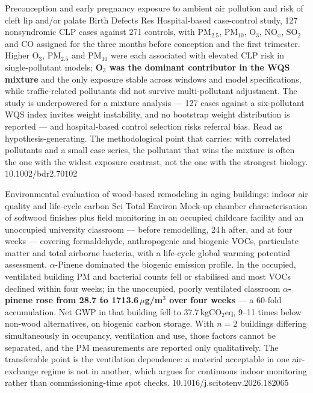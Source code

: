 \documentclass[10pt]{article}
\begin{document}

{Preconception and early pregnancy exposure to ambient air pollution and risk of cleft
lip and/or palate}
{Birth Defects Res}
{Hospital-based case-control study, 127 nonsyndromic CLP cases against 271 controls, with
PM$_{2.5}$, PM$_{10}$, O$_3$, NO$_x$, SO$_2$ and CO assigned for the three months before
conception and the first trimester. Higher O$_3$, PM$_{2.5}$ and PM$_{10}$ were each
associated with elevated CLP risk in single-pollutant models; \textbf{O$_3$ was the
dominant contributor in the WQS mixture} and the only exposure stable across windows and
model specifications, while traffic-related pollutants did not survive multi-pollutant
adjustment. The study is underpowered for a mixture analysis --- 127 cases against a
six-pollutant WQS index invites weight instability, and no bootstrap weight distribution
is reported --- and hospital-based control selection risks referral bias. Read as
hypothesis-generating. The methodological point that carries: with correlated pollutants
and a small case series, the pollutant that wins the mixture is often the one with the
widest exposure contrast, not the one with the strongest biology.}
{10.1002/bdr2.70102}

\clearpage


{Environmental evaluation of wood-based remodeling in aging buildings: indoor air quality
and life-cycle carbon}
{Sci Total Environ}
{Mock-up chamber characterisation of softwood finishes plus field monitoring in an
occupied childcare facility and an unoccupied university classroom --- before
remodelling, 24\,h after, and at four weeks --- covering formaldehyde, anthropogenic and
biogenic VOCs, particulate matter and total airborne bacteria, with a life-cycle global
warming potential assessment. $\alpha$-Pinene dominated the biogenic emission profile.
In the occupied, ventilated building PM and bacterial counts fell or stabilised and most
VOCs declined within four weeks; in the unoccupied, poorly ventilated classroom
\textbf{$\alpha$-pinene rose from 28.7 to 1713.6\,$\mu$g/m$^3$ over four weeks} --- a
60-fold accumulation. Net GWP in that building fell to 37.7\,kgCO$_2$eq, 9--11 times
below non-wood alternatives, on biogenic carbon storage. With $n = 2$ buildings differing
simultaneously in occupancy, ventilation and use, those factors cannot be separated, and
the PM measurements are reported only qualitatively. The transferable point is the
ventilation dependence: a material acceptable in one air-exchange regime is not in
another, which argues for continuous indoor monitoring rather than commissioning-time
spot checks.}
{10.1016/j.scitotenv.2026.182065}
\end{document}
